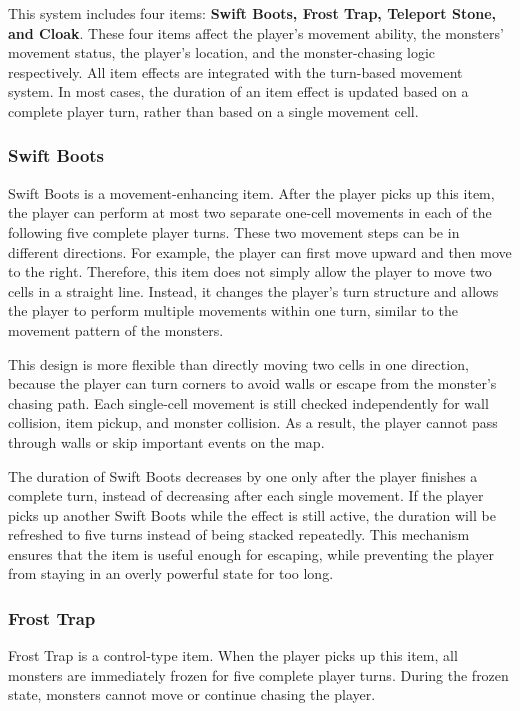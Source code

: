 This system includes four items: \textbf{Swift Boots, Frost Trap, Teleport Stone, and Cloak}. These four items affect the player’s movement ability, the monsters’ movement status, the player’s location, and the monster-chasing logic respectively. All item effects are integrated with the turn-based movement system. In most cases, the duration of an item effect is updated based on a complete player turn, rather than based on a single movement cell.

\subsubsection{Swift Boots}

Swift Boots is a movement-enhancing item. After the player picks up this item, the player can perform at most two separate one-cell movements in each of the following five complete player turns. These two movement steps can be in different directions. For example, the player can first move upward and then move to the right. Therefore, this item does not simply allow the player to move two cells in a straight line. Instead, it changes the player’s turn structure and allows the player to perform multiple movements within one turn, similar to the movement pattern of the monsters.

This design is more flexible than directly moving two cells in one direction, because the player can turn corners to avoid walls or escape from the monster’s chasing path. Each single-cell movement is still checked independently for wall collision, item pickup, and monster collision. As a result, the player cannot pass through walls or skip important events on the map.

The duration of Swift Boots decreases by one only after the player finishes a complete turn, instead of decreasing after each single movement. If the player picks up another Swift Boots while the effect is still active, the duration will be refreshed to five turns instead of being stacked repeatedly. This mechanism ensures that the item is useful enough for escaping, while preventing the player from staying in an overly powerful state for too long.

\subsubsection{Frost Trap}

Frost Trap is a control-type item. When the player picks up this item, all monsters are immediately frozen for five complete player turns. During the frozen state, monsters cannot move or continue chasing the player.

